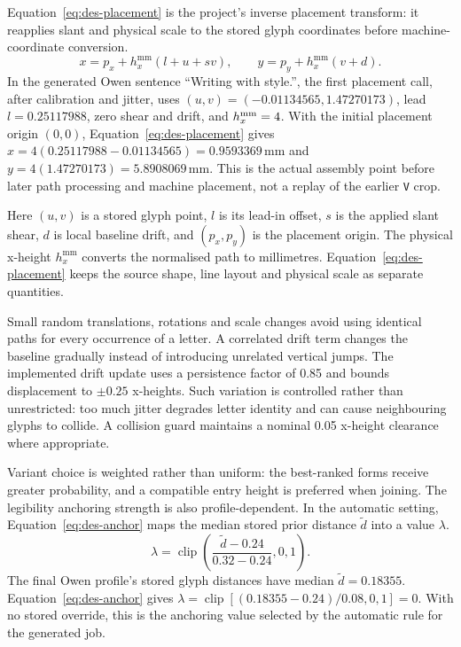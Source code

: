 Equation~\ref{eq:des-placement} is the project's inverse placement transform: it reapplies slant and physical scale to the stored glyph coordinates before machine-coordinate conversion.
\begin{equation}
x=p_x+h_x^{\mathrm{mm}}(l+u+sv),\qquad
y=p_y+h_x^{\mathrm{mm}}(v+d).
\label{eq:des-placement}
\end{equation}
In the generated Owen sentence ``Writing with style.'', the first placement call, after calibration and jitter, uses $(u,v)=(-0.01134565,1.47270173)$, lead $l=0.25117988$, zero shear and drift, and $h_x^{\rm mm}=4$. With the initial placement origin $(0,0)$, Equation~\ref{eq:des-placement} gives $x=4(0.25117988-0.01134565)=0.9593369$\,mm and $y=4(1.47270173)=5.8908069$\,mm. This is the actual assembly point before later path processing and machine placement, not a replay of the earlier \texttt{V} crop.

Here $(u,v)$ is a stored glyph point, $l$ is its lead-in offset, $s$ is the applied slant shear, $d$ is local baseline drift, and $(p_x,p_y)$ is the placement origin. The physical x-height $h_x^{\mathrm{mm}}$ converts the normalised path to millimetres. Equation~\ref{eq:des-placement} keeps the source shape, line layout and physical scale as separate quantities.

Small random translations, rotations and scale changes avoid using identical paths for every occurrence of a letter. A correlated drift term changes the baseline gradually instead of introducing unrelated vertical jumps. The implemented drift update uses a persistence factor of 0.85 and bounds displacement to $\pm0.25$ x-heights. Such variation is controlled rather than unrestricted: too much jitter degrades letter identity and can cause neighbouring glyphs to collide. A collision guard maintains a nominal 0.05 x-height clearance where appropriate.

Variant choice is weighted rather than uniform: the best-ranked forms receive greater probability, and a compatible entry height is preferred when joining. The legibility anchoring strength is also profile-dependent. In the automatic setting, Equation~\ref{eq:des-anchor} maps the median stored prior distance $\widetilde d$ into a value $\lambda$.
\begin{equation}
\lambda=\operatorname{clip}\left(\frac{\widetilde d-0.24}{0.32-0.24},0,1\right).
\label{eq:des-anchor}
\end{equation}
The final Owen profile's stored glyph distances have median $\widetilde d=0.18355$. Equation~\ref{eq:des-anchor} gives $\lambda=\operatorname{clip}[(0.18355-0.24)/0.08,0,1]=0$. With no stored override, this is the anchoring value selected by the automatic rule for the generated job.

